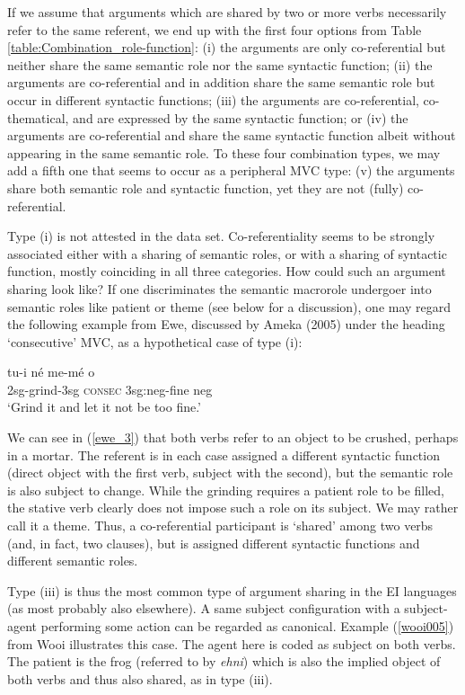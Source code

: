 If we assume that arguments which are shared by two or more verbs necessarily refer to the same referent, we end up with the first four options from Table \ref{table:Combination_role-function}: (i) the arguments are only co-referential but neither share the same semantic role nor the same syntactic function; (ii) the arguments are co-referential and in addition share the same semantic role but occur in different syntactic functions; (iii) the arguments are co-referential, co-thematical, and are expressed by the same syntactic function; or (iv) the arguments are co-referential and share the same syntactic function albeit without appearing in the same semantic role. To these four combination types, we may add a fifth one that seems to occur as a peripheral MVC type: (v) the arguments share both semantic role and syntactic function, yet they are not (fully) co-referential.

Type (i) is not attested in the data set. Co-referentiality seems to be strongly associated either with a sharing of semantic roles, or with a sharing of syntactic function, mostly coinciding in all three categories. How could such an argument sharing look like? If one discriminates the semantic macrorole undergoer into semantic roles like patient or theme (see below for a discussion), one may regard the following example from Ewe, discussed by Ameka (2005) under the heading `consecutive' MVC, as a hypothetical case of type (i):

\ea \label{ewe_3}
\gll tu-i né me-mé o \\
2\acs{sg}-grind-3\acs{sg} \textsc{consec} 3\acs{sg}:\acs{neg}-fine \acs{neg} \\
\glft `Grind it and let it not be too fine.' \\ 
\z
\xe

We can see in (\ref{ewe_3}) that both verbs refer to an object to be crushed, perhaps in a mortar. The referent is in each case assigned a different syntactic function (direct object with the first verb, subject with the second), but the semantic role is also subject to change. While the grinding requires a patient role to be filled, the stative verb clearly does not impose such a role on its subject. We may rather call it a theme. Thus, a co-referential participant is `shared' among two verbs (and, in fact, two clauses), but is assigned different syntactic functions and different semantic roles.

Type (iii) is thus the most common type of argument sharing in the EI languages (as most probably also elsewhere). A same subject configuration with a subject-agent performing some action can be regarded as canonical. Example (\ref{wooi005}) from Wooi illustrates this case. The agent here is coded as subject on both verbs. The patient is the frog (referred to by \textit{ehni}) which is also the implied object of both verbs and thus also shared, as in type (iii).


